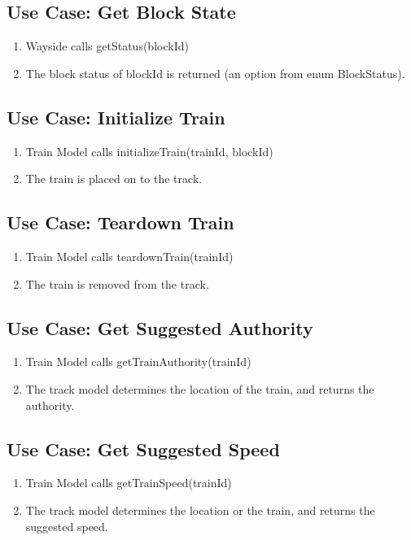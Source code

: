 \documentclass{scrreprt}
\begin{document}
\subsection{Use Case: Get Block State}
\begin{enumerate}
	\item Wayside calls getStatus(blockId)
	\item The block status of blockId is returned (an option from enum BlockStatus).
\end{enumerate}

\subsection{Use Case: Initialize Train}
\begin{enumerate}
	\item Train Model calls initializeTrain(trainId, blockId)
	\item The train is placed on to the track.
\end{enumerate}

\subsection{Use Case: Teardown Train}
\begin{enumerate}
	\item Train Model calls teardownTrain(trainId)
	\item The train is removed from the track.
\end{enumerate}

\subsection{Use Case: Get Suggested Authority}
\begin{enumerate}
	\item Train Model calls getTrainAuthority(trainId)
	\item The track model determines the location of the train, and returns the authority.
\end{enumerate}

\subsection{Use Case: Get Suggested Speed}
\begin{enumerate}
	\item Train Model calls getTrainSpeed(trainId)
	\item The track model determines the location or the train, and returns the suggested speed.
\end{enumerate}
\end{document}
